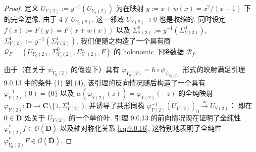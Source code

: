 \begin{proof}
定义 \(U_{Y(2)} := y^{-1}\left(U_{Y_0(2)}\right)\) 为在映射 \(y := x + w(x) = x^2/(x-1)\) 下的完全逆像. 
由于 \(4 \notin U_{Y_0(2)}\), 这一邻域 \(U_{Y(2)} \ni 0\) 也是收缩的. 
同时设定 \(f(x) := F(y) = F(x + w(x))\) 以及 \(\Sigma_{Y(2)}^0 := y^{-1}\left(\Sigma_{Y(2)}^0\right)\), 
\(\Sigma_{Y(2)}^1 := y^{-1}\left(\Sigma_{Y(2)}^1\right)\), 
我们便随之构造了一个具有商 \(\mathcal{Q}_F = \left(U_{Y_0(2)}, \Sigma_{Y_0(2)}^0, \Sigma_{Y_0(2)}^1, F\right)\) 的 holonomic 下降数据 \(\mathcal{R}_f\).

由于（在关于 \(\psi_{Y_0(2)}\) 的假设下）具有 \(\varphi_{Y_0(2)} = h \circ \psi_{\psi_{Y_0(2)}}\) 
形式的映射满足引理 9.0.13 中的条件 (1) 到 (4), 
该引理的反向情况随后构造了一个具有 \(\varphi_{Y(2)}^{-1}(0) = \{0\}\) 以及 \(w\left(\varphi_{Y(2)}(z)\right) = \varphi_{Y(2)}(-z)\) 
的全纯映射 \(\varphi_{Y(2)} : \overline{\mathbf{D}} \to \mathbf{C} \setminus \{1, \Sigma_{Y(2)}^1\}\), 
并诱导了共形同构 \(\varphi_{Y(2)}^{-1}\left(U_{Y(2)}\right)_0 \xrightarrow{\simeq} U_{Y(2)}\)： 
即在 \(0 \in \mathbf{D}\) 处关于 \(U_{Y(2)}\) 的一个单价叶. 
引理 9.0.13 的前向情况现在证明了全纯性 \(\varphi_{Y(2)}^*f \in \mathcal{O}(\overline{\mathbf{D}})\) 
以及轴对称化关系 \eqref{eq:9.0.16}, 
这特别地表明了全纯性 \(\varphi_{Y_0(2)}^*F \in \mathcal{O}(\overline{\mathbf{D}})\).
\end{proof}

